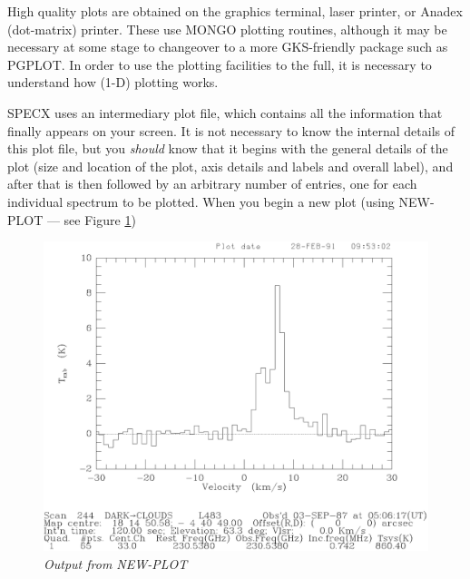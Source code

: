 \documentclass[11pt,twoside]{report}
\begin{document}
High quality plots are obtained on the graphics terminal, laser printer, or Anadex
(dot-matrix) printer. These use
MONGO plotting routines, although it may be necessary at some
stage to changeover to a more GKS-friendly package such as
PGPLOT. In order to use the plotting facilities to the full, it
is necessary to understand how (1-D) plotting works.

SPECX uses an intermediary plot file, which contains all the
information that finally appears on your screen. It is not necessary to know
the internal details of this plot file, but you {\em should} know that it
begins with the general details of the plot (size and location of the plot,
axis details and labels and overall label), and after that is then followed by
an arbitrary number of entries, one for each individual spectrum to be plotted.
When you begin a new plot (using NEW-PLOT --- see Figure \ref{NEW})
\begin{figure}[htbp]
\begin{center}
\includegraphics[scale=0.65]{new-plot.ps}
\protect\parbox{5.5in}
{\caption[NEW]
{\sl
Output from NEW-PLOT
\label{NEW}
}
}
\end{center}
\end{figure}
\end{document}

